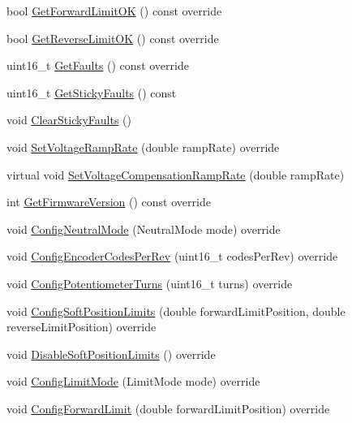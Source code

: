 \begin{DoxyCompactItemize}
\item 
bool \hyperlink{class_c_a_n_talon_af9f50de12a090b0b70edb2dc57e48f61}{Get\+Forward\+Limit\+OK} () const override
\item 
bool \hyperlink{class_c_a_n_talon_a70234020208d2e49600868e959eb640f}{Get\+Reverse\+Limit\+OK} () const override
\item 
uint16\+\_\+t \hyperlink{class_c_a_n_talon_aeee8ab02812ca4f4fac0baefff57bfbc}{Get\+Faults} () const override
\item 
uint16\+\_\+t \hyperlink{class_c_a_n_talon_a994239a9436868e2fee189ce87b7c9be}{Get\+Sticky\+Faults} () const
\item 
void \hyperlink{class_c_a_n_talon_ab4a9db0ef97b04adb93d2e200a9b9573}{Clear\+Sticky\+Faults} ()
\item 
void \hyperlink{class_c_a_n_talon_abb4db45c90b0fe66c595c73880d4f67d}{Set\+Voltage\+Ramp\+Rate} (double ramp\+Rate) override
\item 
virtual void \hyperlink{class_c_a_n_talon_a3608afbdaa6a0c4e9c63c70bbcae38ed}{Set\+Voltage\+Compensation\+Ramp\+Rate} (double ramp\+Rate)
\item 
int \hyperlink{class_c_a_n_talon_a16f7d01201fe09094a76fdd192307b2a}{Get\+Firmware\+Version} () const override
\item 
void \hyperlink{class_c_a_n_talon_a7a6a2ce755982ff35031664736927026}{Config\+Neutral\+Mode} (Neutral\+Mode mode) override
\item 
void \hyperlink{class_c_a_n_talon_ad7dce04cbc276a76ca6ea8048da13908}{Config\+Encoder\+Codes\+Per\+Rev} (uint16\+\_\+t codes\+Per\+Rev) override
\item 
void \hyperlink{class_c_a_n_talon_a83b286995d244b8d9e7530c190ab8eca}{Config\+Potentiometer\+Turns} (uint16\+\_\+t turns) override
\item 
void \hyperlink{class_c_a_n_talon_a3e5d464de61b9005f33edd0b9db714ec}{Config\+Soft\+Position\+Limits} (double forward\+Limit\+Position, double reverse\+Limit\+Position) override
\item 
void \hyperlink{class_c_a_n_talon_a5fda4cb5db6d3b4b400222f549d91621}{Disable\+Soft\+Position\+Limits} () override
\item 
void \hyperlink{class_c_a_n_talon_a6720f4720939dd590b1db6a33d09aef2}{Config\+Limit\+Mode} (Limit\+Mode mode) override
\item 
void \hyperlink{class_c_a_n_talon_a21f11e090b3cd0c04e1bd65a6f3db6ae}{Config\+Forward\+Limit} (double forward\+Limit\+Position) override
\item 

\end{DoxyCompactItemize}
